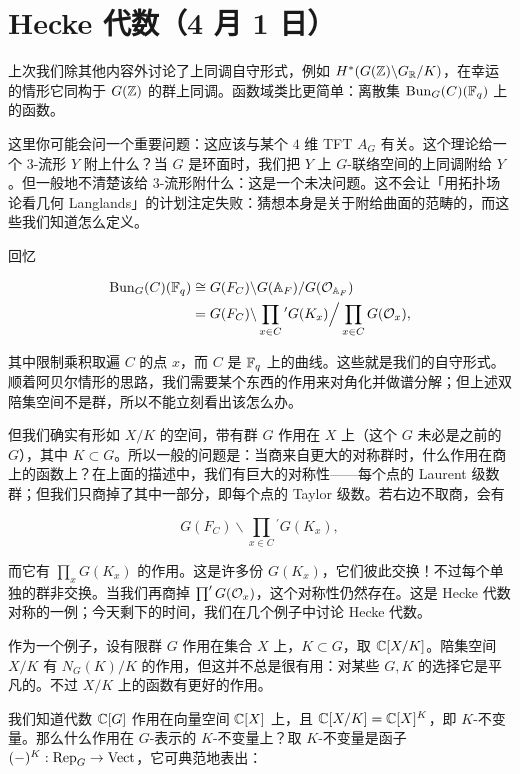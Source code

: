 \section[Hecke 代数]{Hecke 代数（4 月 1 日）}


上次我们除其他内容外讨论了上同调自守形式，例如 $H^*(G(\mathbb{Z})\backslash G_{\mathbb{R}}/K)$，在幸运的情形它同构于 $G(\mathbb{Z})$ 的群上同调。函数域类比更简单：离散集 $\mathrm{Bun}_G(C)(\mathbb{F}_q)$ 上的函数。

这里你可能会问一个重要问题：这应该与某个 $4$ 维 TFT $A_G$ 有关。这个理论给一个 $3$-流形 $Y$ 附上什么？当 $G$ 是环面时，我们把 $Y$ 上 $G$-联络空间的上同调附给 $Y$。但一般地不清楚该给 $3$-流形附什么：这是一个未决问题。这不会让「用拓扑场论看几何 Langlands」的计划注定失败：猜想本身是关于附给曲面的范畴的，而这些我们知道怎么定义。

回忆

\[\begin{aligned}
\mathrm{Bun}_G(C)(\mathbb{F}_q)&\cong G(F_C)\backslash G(\mathbb{A}_F)/G(\mathcal{O}_{\mathbb{A}_F})\\
&=G(F_C)\backslash \prod_{x\in C}{}^{\prime} G(K_x)\Big/ \prod_{x\in C} G(\mathcal{O}_x),
\end{aligned}\]


其中限制乘积取遍 $C$ 的点 $x$，而 $C$ 是 $\mathbb{F}_q$ 上的曲线。这些就是我们的自守形式。顺着阿贝尔情形的思路，我们需要某个东西的作用来对角化并做谱分解；但上述双陪集空间不是群，所以不能立刻看出该怎么办。

但我们确实有形如 $X/K$ 的空间，带有群 $G$ 作用在 $X$ 上（这个 $G$ 未必是之前的 $G$），其中 $K\subset G$。所以一般的问题是：当商来自更大的对称群时，什么作用在商上的函数上？在上面的描述中，我们有巨大的对称性——每个点的 Laurent 级数群；但我们只商掉了其中一部分，即每个点的 Taylor 级数。若右边不取商，会有

\[G(F_C)\backslash \prod_{x\in C}{}^{\prime} G(K_x),\]

而它有 $\prod_x G(K_x)$ 的作用。这是许多份 $G(K_x)$，它们彼此交换！不过每个单独的群非交换。当我们再商掉 $\prod' G(\mathcal{O}_x)$，这个对称性仍然存在。这是 Hecke 代数对称的一例；今天剩下的时间，我们在几个例子中讨论 Hecke 代数。

作为一个例子，设有限群 $G$ 作用在集合 $X$ 上，$K\subset G$，取 $\mathbb{C}[X/K]$。陪集空间 $X/K$ 有 $N_G(K)/K$ 的作用，但这并不总是很有用：对某些 $G,K$ 的选择它是平凡的。不过 $X/K$ 上的函数有更好的作用。

我们知道代数 $\mathbb{C}[G]$ 作用在向量空间 $\mathbb{C}[X]$ 上，且 $\mathbb{C}[X/K]=\mathbb{C}[X]^K$，即 $K$-不变量。那么什么作用在 $G$-表示的 $K$-不变量上？取 $K$-不变量是函子 $(-)^K:\operatorname{Rep}_G\to\mathrm{Vect}$，它可典范地表出：

